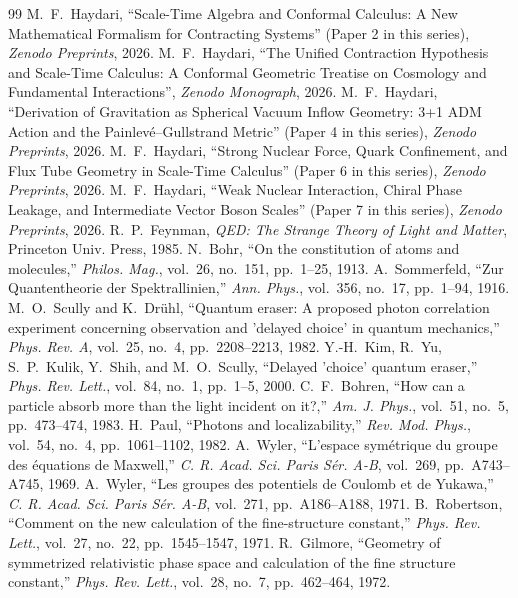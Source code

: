 \documentclass[11pt,a4paper]{article}
\begin{document}
\begin{thebibliography}{99}
     M.~F.~Haydari, ``Scale-Time Algebra and Conformal Calculus: A New Mathematical Formalism for Contracting Systems'' (Paper 2 in this series), \textit{Zenodo Preprints}, 2026.
     M.~F.~Haydari, ``The Unified Contraction Hypothesis and Scale-Time Calculus: A Conformal Geometric Treatise on Cosmology and Fundamental Interactions'', \textit{Zenodo Monograph}, 2026.
     M.~F.~Haydari, ``Derivation of Gravitation as Spherical Vacuum Inflow Geometry: 3+1 ADM Action and the Painlevé--Gullstrand Metric'' (Paper 4 in this series), \textit{Zenodo Preprints}, 2026.
     M.~F.~Haydari, ``Strong Nuclear Force, Quark Confinement, and Flux Tube Geometry in Scale-Time Calculus'' (Paper 6 in this series), \textit{Zenodo Preprints}, 2026.
     M.~F.~Haydari, ``Weak Nuclear Interaction, Chiral Phase Leakage, and Intermediate Vector Boson Scales'' (Paper 7 in this series), \textit{Zenodo Preprints}, 2026.
     R.~P.~Feynman, \textit{QED: The Strange Theory of Light and Matter}, Princeton Univ. Press, 1985.
     N.~Bohr, ``On the constitution of atoms and molecules,'' \textit{Philos. Mag.}, vol.~26, no.~151, pp.~1--25, 1913.
     A.~Sommerfeld, ``Zur Quantentheorie der Spektrallinien,'' \textit{Ann. Phys.}, vol.~356, no.~17, pp.~1--94, 1916.
     M.~O.~Scully and K.~Dr\"uhl, ``Quantum eraser: A proposed photon correlation experiment concerning observation and 'delayed choice' in quantum mechanics,'' \textit{Phys. Rev. A}, vol.~25, no.~4, pp.~2208--2213, 1982.
     Y.-H.~Kim, R.~Yu, S.~P.~Kulik, Y.~Shih, and M.~O.~Scully, ``Delayed 'choice' quantum eraser,'' \textit{Phys. Rev. Lett.}, vol.~84, no.~1, pp.~1--5, 2000.
     C.~F.~Bohren, ``How can a particle absorb more than the light incident on it?,'' \textit{Am. J. Phys.}, vol.~51, no.~5, pp.~473--474, 1983.
     H.~Paul, ``Photons and localizability,'' \textit{Rev. Mod. Phys.}, vol.~54, no.~4, pp.~1061--1102, 1982.
     A.~Wyler, ``L'espace sym\'etrique du groupe des \'equations de Maxwell,'' \textit{C. R. Acad. Sci. Paris S\'er. A-B}, vol.~269, pp.~A743--A745, 1969.
     A.~Wyler, ``Les groupes des potentiels de Coulomb et de Yukawa,'' \textit{C. R. Acad. Sci. Paris S\'er. A-B}, vol.~271, pp.~A186--A188, 1971.
     B.~Robertson, ``Comment on the new calculation of the fine-structure constant,'' \textit{Phys. Rev. Lett.}, vol.~27, no.~22, pp.~1545--1547, 1971.
     R.~Gilmore, ``Geometry of symmetrized relativistic phase space and calculation of the fine structure constant,'' \textit{Phys. Rev. Lett.}, vol.~28, no.~7, pp.~462--464, 1972.
\end{thebibliography}
\end{document}
